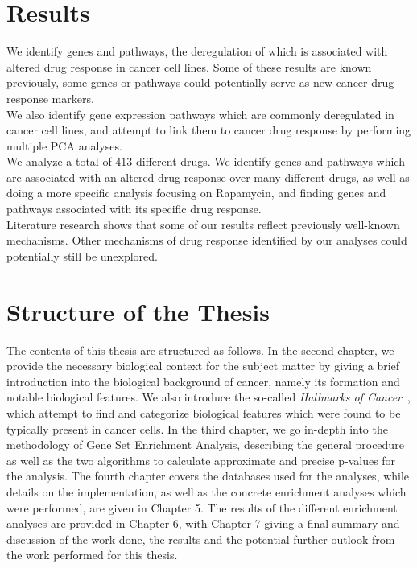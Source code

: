 \section*{Results}
We identify genes and pathways, the deregulation of which is associated with altered drug response in cancer cell lines. Some of these results are known previously, some genes or pathways could potentially serve as new cancer drug response markers.\\
We also identify gene expression pathways which are commonly deregulated in cancer cell lines, and attempt to link them to cancer drug response by performing multiple PCA analyses.\\
We analyze a total of $413$ different drugs. We identify genes and pathways which are associated with an altered drug response over many different drugs, as well as doing a more specific analysis focusing on Rapamycin, and finding genes and pathways associated with its specific drug response.\\
Literature research shows that some of our results reflect previously well-known mechanisms. Other mechanisms of drug response identified by our analyses could potentially still be unexplored.

\section*{Structure of the Thesis}
The contents of this thesis are structured as follows. In the second chapter, we provide the necessary biological context for the subject matter by giving a brief introduction into the biological background of cancer, namely its formation and notable biological features. We also introduce the so-called \textit{Hallmarks of Cancer}~\cite{hallmarks-of-cancer,hallmarks-of-cancer-next-generation}, which attempt to find and categorize biological features which were found to be typically present in cancer cells. In the third chapter, we go in-depth into the methodology of Gene Set Enrichment Analysis, describing the general procedure as well as the two algorithms to calculate approximate and precise p-values for the analysis. The fourth chapter covers the databases used for the analyses, while details on the implementation, as well as the concrete enrichment analyses which were performed, are given in Chapter 5. The results of the different enrichment analyses are provided in Chapter 6, with Chapter 7 giving a final summary and discussion of the work done, the results and the potential further outlook from the work performed for this thesis.\\